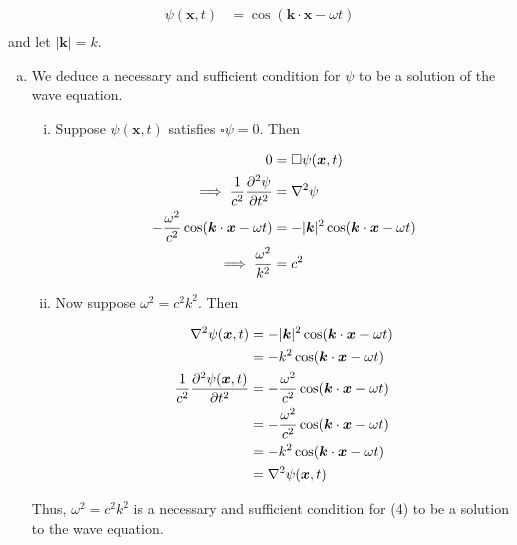 \documentclass[]{article}
\begin{document}
\begin{equation}
\begin{split}
\psi(\bm{x},t) & = \cos(  \bm{k}\cdot\bm{x} - \omega t )  \\
\end{split}
\end{equation}
and let $|\bm{k}| = k$. 
\begin{enumerate}[a)]

\item We deduce a necessary and sufficient condition for $\psi$ to be a solution of the wave equation. \\

\begin{enumerate}[i)]

\item Suppose $\psi (\bm{x},t)$ satisfies $\square \psi = 0$. Then

\begin{equation}
\begin{split}
0 & = \square \psi  (\bm{x},t) \\
\implies \frac{1}{c^2} \pdv[2]{\psi}{t}  & = \laplacian \psi \\
-\frac{\omega^2}{c^2} \cos(  \bm{k}\cdot\bm{x} - \omega t )  & = - |\bm{k}|^2 \cos(  \bm{k}\cdot\bm{x} - \omega t ) \\
\implies \frac{\omega^2}{k^2} & = c^2 \\
\end{split}
\end{equation}

\item Now suppose $\omega^2= c^2k^2$. Then 

\begin{equation}
\begin{split}
\laplacian \psi (\bm{x},t) & =  - |\bm{k}|^2 \cos(  \bm{k}\cdot\bm{x} - \omega t ) \\
& = - k^2  \cos(  \bm{k}\cdot\bm{x} - \omega t ) \\ 
\frac{1}{c^2} \pdv[2]{ \psi (\bm{x},t) }{t} & = - \frac{\omega^2 }{c^2} \cos(  \bm{k}\cdot\bm{x} - \omega t ) \\
& = - \frac{\omega^2 }{c^2} \cos(  \bm{k}\cdot\bm{x} - \omega t ) \\
& = - k^2 \cos(  \bm{k}\cdot\bm{x} - \omega t ) \\
& = \laplacian \psi (\bm{x},t) \\
\end{split}
\end{equation}
\end{enumerate}
Thus, $\omega^2= c^2k^2$ is a necessary and sufficient condition for (4) to be a solution to the wave equation. \\


\end{enumerate}
\end{document}
